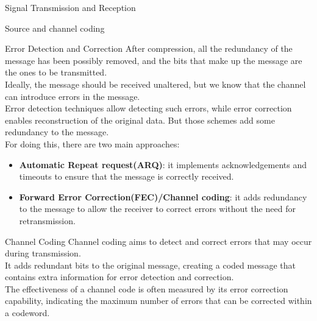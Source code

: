 \begin{section}{Signal Transmission and Reception}
\begin{section}{Source and channel coding}
    \begin{subsection}{Error Detection and Correction}
      After compression, all the redundancy of the message has been possibly removed, and the bits
      that make up the message are the ones to be transmitted.\\
      Ideally, the message should be received unaltered, but we know that the channel can introduce
      errors in the message.\\
      Error detection techniques allow detecting such errors, while error correction enables 
      reconstruction of the original data. But those schemes add some redundancy to the message.\\
      For doing this, there are two main approaches:
      \begin{itemize}
        \item \textbf{Automatic Repeat request(ARQ)}: it implements acknowledgements and timeouts
          to ensure that the message is correctly received. 
        \item \textbf{Forward Error Correction(FEC)/Channel coding}: it adds redundancy to the 
          message to allow
          the receiver to correct errors without the need for retransmission.
      \end{itemize}
      \begin{subsubsection}{Channel Coding}
        Channel coding aims to detect and correct errors that may occur during transmission.\\
        It adds redundant bits to the original message, creating a coded message that contains 
        extra information for error detection and correction.\\
        The effectiveness of a channel code is often measured by its error correction capability,
        indicating the maximum number of errors that can be corrected within a codeword.\\


\end{subsubsection}
\end{subsection}
\end{section}
\end{section}
